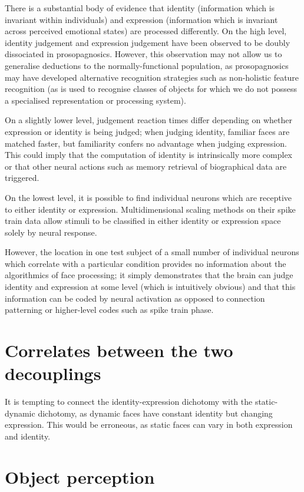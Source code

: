 There is a substantial body of evidence that identity (information which is invariant within individuals) and expression (information which is invariant across perceived emotional states) are processed differently. On the high level, identity judgement and expression judgement have been observed to be doubly dissociated in prosopagnosics\cite{archer1994movement}. However, this observation may not allow us to generalise deductions to the normally-functional population, as prosopagnosics may have developed alternative recognition strategies such as non-holistic feature recognition (as is used to recognise classes of objects for which we do not possess a specialised representation or processing system).

On a slightly lower level, judgement reaction times differ depending on whether expression or identity is being judged; when judging identity, familiar faces are matched faster, but familiarity confers no advantage when judging expression\cite{bruce1986understanding}. This could imply that the computation of identity is intrinsically more complex or that other neural actions such as memory retrieval of biographical data are triggered.

On the lowest level, it is possible to find individual neurons which are receptive to either identity or expression\cite{hasselmo1989role}. Multidimensional scaling methods on their spike train data allow stimuli to be classified in either identity or expression space solely by neural response.

However, the location in one test subject of a small number of individual neurons which correlate with a particular condition provides no information about the algorithmics of face processing; it simply demonstrates that the brain can judge identity and expression at some level (which is intuitively obvious) and that this information can be coded by neural activation as opposed to connection patterning or higher-level codes such as spike train phase.

\section{Correlates between the two decouplings}

It is tempting to connect the identity-expression dichotomy with the static-dynamic dichotomy, as dynamic faces have constant identity but changing expression. This would be erroneous, as static faces can vary in both expression and identity.

\section{Object perception}

